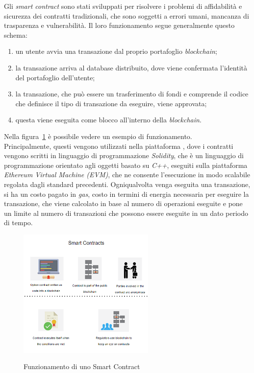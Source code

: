 Gli \textit{smart contract} sono stati sviluppati per risolvere i problemi di affidabilità e sicurezza dei contratti tradizionali, che sono soggetti a errori umani, mancanza di trasparenza e vulnerabilità.
Il loro funzionamento segue generalmente questo schema:
\begin{enumerate}
    \item un utente avvia una transazione dal proprio portafoglio \textit{blockchain};
    \item la transazione arriva al database distribuito, dove viene confermata l'identità del portafoglio dell'utente;
    \item la transazione, che può essere un trasferimento di fondi e comprende il codice che definisce il tipo di transazione da eseguire, viene approvata;
    \item questa viene eseguita come blocco all'interno della \textit{blockchain}.
\end{enumerate}
Nella figura~\ref{fig:smart-contract} è possibile vedere un esempio di funzionamento. \\

Principalmente, questi vengono utilizzati nella piattaforma , dove i contratti vengono scritti in linguaggio di programmazione \textit{Solidity}, 
che è un linguaggio di programmazione orientato agli oggetti basato su \textit{C++},
eseguiti sulla piattaforma \textit{Ethereum Virtual Machine (EVM)}, che ne consente l'esecuzione in modo scalabile regolata dagli standard precedenti.
Ogniqualvolta venga eseguita una transazione, si ha un costo pagato in \textit{gas}, costo in termini di energia necessaria per eseguire la transazione, che viene calcolato in base al numero di operazioni eseguite
e pone un limite al numero di transazioni che possono essere eseguite in un dato periodo di tempo. \\

\begin{figure}[ht]
    \centering
    \includegraphics[width=0.6\textwidth, alt={Come funziona uno Smart Contract}]{immagini/smart-contract.png}
    \caption{Funzionamento di uno Smart Contract}\label{fig:smart-contract}
\end{figure}

